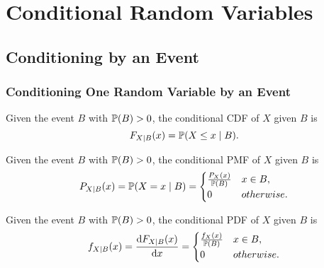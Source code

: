 \chapter{Conditional Random Variables}

\section{Conditioning by an Event}
\subsection{Conditioning One Random Variable by an Event}
\begin{definition}
    Given the event $B$ with $\P{B} > 0$, the conditional \textnormal{CDF} of $X$ given $B$ is
    \[F_{X\mid B}(x)=\P{X\leq x\mid B}.\]
\end{definition}

\begin{definition}
    Given the event $B$ with $\P{B} > 0$, the conditional \textnormal{PMF} of $X$ given $B$ is
    \[P_{X\mid B}(x)=\P{X=x\mid B} ={
        \begin{cases}
            \frac{P_{X}(x)}{\P{B}} & x\in B, \\
            0 & otherwise.
        \end{cases}
    }\]
\end{definition}

\begin{definition}
    Given the event $B$ with $\P{B} > 0$, the conditional \textnormal{PDF} of $X$ given $B$ is
    \[f_{X\mid B}(x)=\frac{\mathop{}\!\mathrm{d} F_{X\mid B}(x)}{\mathop{}\!\mathrm{d} x}={
        \begin{cases}
            \frac{f_{X}(x)}{\mathbb{P}\left\lparen B\right\rparen} & x\in B, \\
            0 & otherwise.
        \end{cases}
    }\]
\end{definition}


